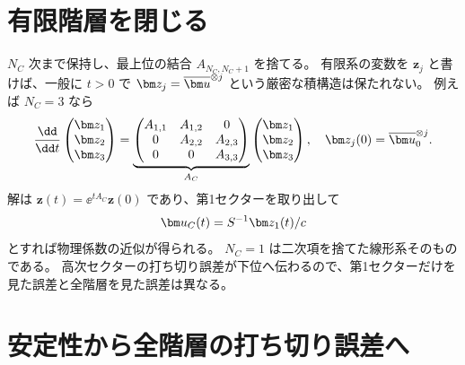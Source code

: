 \section{有限階層を閉じる}
$N_C$ 次まで保持し、最上位の結合 $A_{N_C,N_C+1}$ を捨てる。
有限系の変数を $\bm z_j$ と書けば、一般に $t>0$ で $\bm z_j=\bu^{\otimes j}$ という厳密な積構造は保たれない。
例えば $N_C=3$ なら
\begin{equation}
\frac{\dd}{\dd t}
\begin{pmatrix}\bm z_1\\\bm z_2\\\bm z_3\end{pmatrix}
=\underbrace{\begin{pmatrix}
 A_{1,1}&A_{1,2}&0\\0&A_{2,2}&A_{2,3}\\0&0&A_{3,3}
\end{pmatrix}}_{A_C}
\begin{pmatrix}\bm z_1\\\bm z_2\\\bm z_3\end{pmatrix},\quad
\bm z_j(0)=\bu_0^{\otimes j}.
\end{equation}
解は $\bm z(t)=\ee^{tA_C}\bm z(0)$ であり、第1セクターを取り出して
\begin{equation}
\uu_C(t)=S^{-1}\bm z_1(t)/c
\label{eq:recover}
\end{equation}
とすれば物理係数の近似が得られる。
$N_C=1$ は二次項を捨てた線形系そのものである。
高次セクターの打ち切り誤差が下位へ伝わるので、第1セクターだけを見た誤差と全階層を見た誤差は異なる。

\section{安定性から全階層の打ち切り誤差へ}
